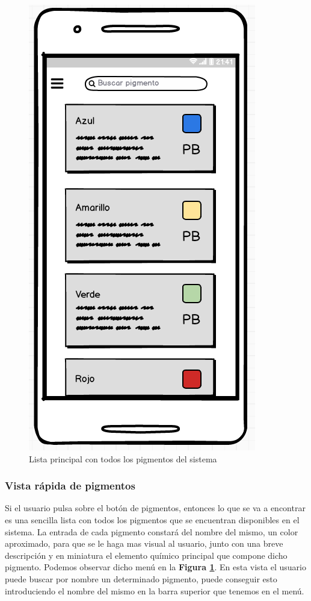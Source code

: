 \begin{multicols}{2}
    \begin{figure}[H]
    \centering
    \includegraphics[scale=0.6]{imagenes/diseno/lista.png}
    \caption{Lista principal con todos los pigmentos del sistema}
    \label{fig:listaPigmentos}
    \end{figure}
\end{multicols}

\subsubsection*{Vista rápida de pigmentos}

Si el usuario pulsa sobre el botón de pigmentos, entonces lo que se va a encontrar es una sencilla lista con todos los pigmentos que se encuentran disponibles en el sistema. La entrada de cada pigmento constará del nombre del mismo, un color aproximado, para que se le haga mas visual al usuario, junto con una breve descripción y en miniatura el elemento químico principal que compone dicho pigmento. Podemos observar dicho menú en la \textbf{Figura \ref{fig:listaPigmentos}}. En esta vista el usuario puede buscar por nombre un determinado pigmento, puede conseguir esto introduciendo el nombre del mismo en la barra superior que tenemos en el menú.

